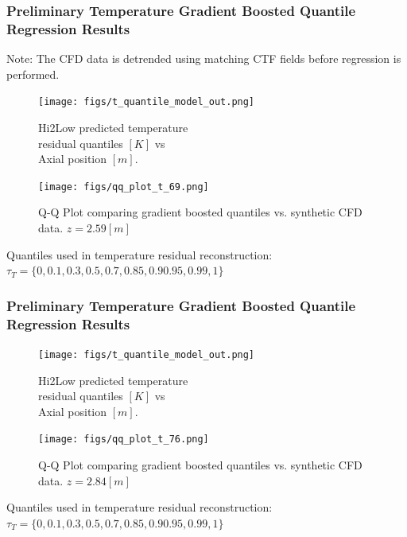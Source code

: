 \documentclass[t, pdftex]{beamer}
\begin{document}
\begin{frame}\frametitle{ \small Preliminary Temperature Gradient Boosted Quantile Regression Results}
Note: The CFD data is detrended using matching CTF fields before regression is performed.
    \begin{figure}
        \centering
        \begin{minipage}{.5\textwidth}
            \centering
            \texttt{[image: figs/t\_quantile\_model\_out.png]}
            \caption{Hi2Low predicted temperature \\ residual quantiles $[K]$ vs \\ Axial position $[m]$.}
        \end{minipage}%
        \begin{minipage}{.5\textwidth}
            \centering
            \texttt{[image: figs/qq\_plot\_t\_69.png]}
            \caption{Q-Q Plot comparing gradient boosted quantiles vs. synthetic CFD data. $z=2.59[m]$}
        \end{minipage}
    \end{figure}
Quantiles used in temperature residual reconstruction: $\tau_{T}=\{0, 0.1, 0.3, 0.5, 0.7, 0.85, 0.9 0.95, 0.99, 1\}$
\end{frame}

\begin{frame}\frametitle{\small Preliminary Temperature Gradient Boosted Quantile Regression Results}
    \begin{figure}
        \centering
        \begin{minipage}{.5\textwidth}
            \centering
            \texttt{[image: figs/t\_quantile\_model\_out.png]}
            \caption{Hi2Low predicted temperature \\ residual quantiles $[K]$ vs \\ Axial position $[m]$.}
        \end{minipage}%
        \begin{minipage}{.5\textwidth}
            \centering
            \texttt{[image: figs/qq\_plot\_t\_76.png]}
            \caption{Q-Q Plot comparing gradient boosted quantiles vs. synthetic CFD data. $z=2.84[m]$}
        \end{minipage}
    \end{figure}
Quantiles used in temperature residual reconstruction: $\tau_{T}=\{0, 0.1, 0.3, 0.5, 0.7, 0.85, 0.9 0.95, 0.99, 1\}$
\end{frame}
\end{document}

